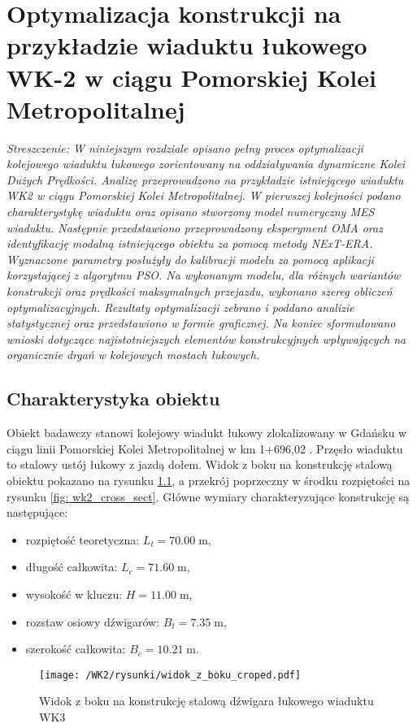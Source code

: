 \chapter{Optymalizacja konstrukcji na przykładzie wiaduktu łukowego WK-2 w ciągu Pomorskiej Kolei Metropolitalnej}

\textit{Streszczenie: W niniejszym rozdziale opisano pełny proces optymalizacji kolejowego wiaduktu łukowego zorientowany na oddziaływania dynamiczne Kolei Dużych Prędkości. Analizę przeprowadzono na przykładzie istniejącego wiaduktu WK2 w ciągu Pomorskiej Kolei Metropolitalnej. W pierwszej kolejności podano charakterystykę wiaduktu oraz opisano stworzony model numeryczny MES wiaduktu. Następnie przedstawiono przeprowadzony eksperyment OMA oraz identyfikację modalną istniejącego obiektu za pomocą metody NExT-ERA. Wyznaczone parametry posłużyły do kalibracji modelu za pomocą aplikacji korzystającej z algorytmu PSO. Na wykonanym modelu, dla różnych wariantów konstrukcji oraz prędkości maksymalnych przejazdu, wykonano szereg obliczeń optymalizacyjnych. Rezultaty optymalizacji zebrano i poddano analizie statystycznej oraz przedstawiono w formie graficznej. Na koniec sformułowano wnioski dotyczące najistotniejszych elementów konstrukcyjnych wpływających na organicznie drgań w kolejowych mostach łukowych.}


\section{Charakterystyka obiektu}
Obiekt badawczy stanowi kolejowy wiadukt łukowy zlokalizowany w Gdańsku w ciągu linii Pomorskiej Kolei Metropolitalnej w km 1+696,02 \parencite{Filipiuk2015,TransprojektGdanski2014}. Przęsło wiaduktu to stalowy ustój łukowy z jazdą dołem. Widok z boku na konstrukcję stalową obiektu pokazano na rysunku \ref{fig: wk2_side_view}, a przekrój poprzeczny w środku rozpiętości na rysunku \ref{fig: wk2_cross_sect}. Główne wymiary charakteryzujące konstrukcję są następujące: 
\begin{itemize}[noitemsep]
	\item rozpiętość teoretyczna: $L_t=70.00 \;\text{m}$, 
	\item długość całkowita:  $L_c=71.60 \;\text{m}$, 
	\item wysokość w kluczu:  $H=11.00 \;\text{m}$,
	\item rozstaw osiowy dźwigarów: $B_t = 7.35 \;\text{m}$,
	\item szerokość całkowita: $B_c=10.21 \;\text{m}$. 
\end{itemize}
 \begin{figure}[hbt!]
	\centering
	\texttt{[image: /WK2/rysunki/widok\_z\_boku\_croped.pdf]}
	\captionsetup{justification=centering}
	\caption{Widok z boku na konstrukcję stalową dźwigara łukowego wiaduktu WK3}
	\label{fig: wk2_side_view}
\end{figure}

